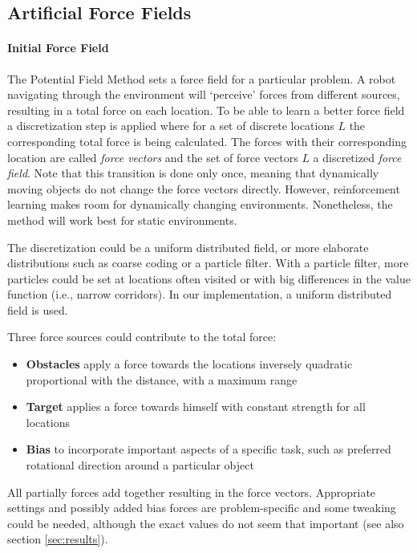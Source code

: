 \documentclass[11pt]{article}
\begin{document}
\subsection{Artificial Force Fields}
\paragraph{Initial Force Field}
The Potential Field Method sets a force field for a particular problem. A robot navigating through the environment will `perceive' forces from different sources, resulting in a total force on each location. To be able to learn a better force field a discretization step is applied where for a set of discrete locations $L$ the corresponding total force is being calculated. The forces with their corresponding location are called \emph{force vectors} and the set of force vectors $L$ a discretized \emph{force field}. Note that this transition is done only once, meaning that dynamically moving objects do not change the force vectors directly. However, reinforcement learning makes room for dynamically changing environments. Nonetheless, the method will work best for static environments.

The discretization could be a uniform distributed field, or more elaborate distributions such as coarse coding or a particle filter. With a particle filter, more particles could be set at locations often visited or with big differences in the value function (i.e., narrow corridors). In our implementation, a uniform distributed field is used.

Three force sources could contribute to the total force:
\begin{itemize}
 \item \textbf{Obstacles} apply a force towards the locations inversely quadratic proportional with the distance, with a maximum range
 \item \textbf{Target} applies a force towards himself with constant strength for all locations
 \item \textbf{Bias} to incorporate important aspects of a specific task, such as preferred rotational direction around a particular object
\end{itemize}

All partially forces add together resulting in the force vectors.
Appropriate settings and possibly added bias forces are problem-specific and some tweaking could be needed, although the exact values do not seem that important (see also section \ref{sec:results}).
\end{document}
